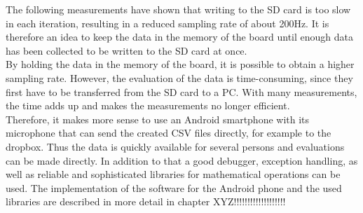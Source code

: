 The following measurements have shown that writing to the SD card is too slow in each iteration, resulting in a reduced sampling rate of about 200Hz. It is therefore an idea to keep the data in the memory of the board until enough data has been collected to be written to the SD card at once. 
\\
By holding the data in the memory of the board, it is possible to obtain a higher sampling rate. However, the evaluation of the data is time-consuming, since they first have to be transferred from the SD card to a PC. With many measurements, the time adds up and makes the measurements no longer efficient. \\
Therefore, it makes more sense to use an Android smartphone with its microphone that can send the created CSV files directly, for example to the dropbox. Thus the data is quickly available for several persons and evaluations can be made directly. In addition to that a good debugger, exception handling, as well as reliable and sophisticated libraries for mathematical operations can be used. The implementation of the software for the Android phone and the used libraries are described in more detail in chapter XYZ!!!!!!!!!!!!!!!!!!!
